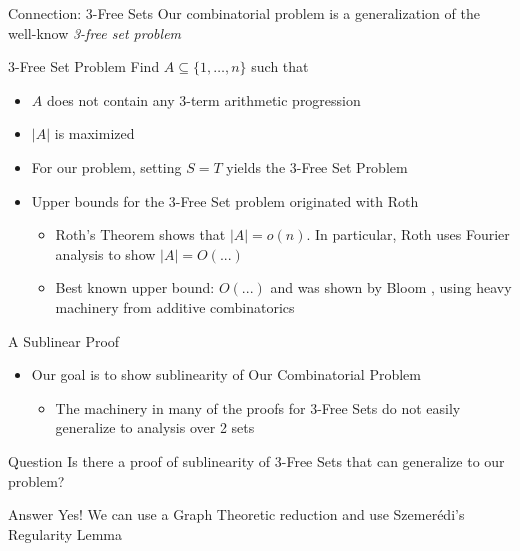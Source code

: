 \begin{frame}{Connection: 3-Free Sets}
Our combinatorial problem is a generalization of the well-know \textit{3-free set problem}

\begin{block}{3-Free Set Problem}
	Find $A \subseteq \{1,\dotsc,n\}$ such that
	\begin{itemize}
		\item $A$ does not contain any 3-term arithmetic progression
		\item $|A|$ is maximized
	\end{itemize}
\end{block}
\begin{itemize}
	\item For our problem, setting $S = T$ yields the 3-Free Set Problem
	\item Upper bounds for the 3-Free Set problem originated with Roth \cite{..-}
	\begin{itemize}
		\item Roth's Theorem shows that $|A| = o(n)$. In particular, Roth uses Fourier analysis to show $|A| = O(...)$
		\item Best known upper bound: $O(...)$ and was shown by Bloom \cite{..}, using heavy machinery from additive combinatorics
	\end{itemize}
\end{itemize}
\end{frame}

\begin{frame}{A Sublinear Proof}

\begin{itemize}
	\item Our goal is to show sublinearity of Our Combinatorial Problem
	\begin{itemize}
		\item The machinery in many of the proofs for 3-Free Sets do not easily generalize to analysis over 2 sets 
	\end{itemize}
\end{itemize}

\begin{block}{Question}
	Is there a proof of sublinearity of 3-Free Sets that can generalize to our problem?
\end{block}

\begin{block}{Answer}
	Yes! We can use a Graph Theoretic reduction and use Szemer\'{e}di's Regularity Lemma
\end{block}

\end{frame}


